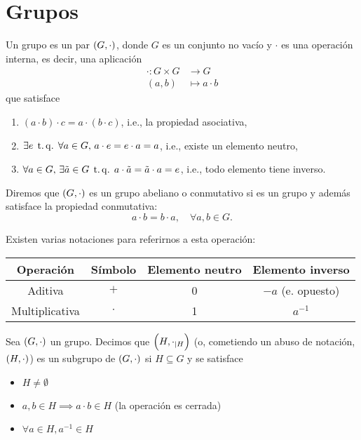 \chapter{Grupos}

\begin{defi}[grupo]
    Un grupo es un par $\left( G, \cdot \right)$, donde $G$ es un conjunto no vacío y $\cdot$ es una operación interna, es decir, una aplicación
    \[
        \begin{aligned}
            \cdot \colon G \times G &\to G \\
            (a, b) &\mapsto a \cdot b
        \end{aligned}
    \]
    que satisface
    \begin{enumerate}
        \item $(a\cdot b)\cdot c = a\cdot (b\cdot c)$, i.e., la propiedad asociativa,
        \item $\exists e \operatorname{\;t.q.\;} \forall a \in G, \, a\cdot e = e\cdot a = a$, i.e., existe un elemento neutro,
        \item $\forall a \in G, \, \exists \tilde{a} \in G \operatorname{\;t.q.\;} a \cdot \tilde{a} = \tilde{a}\cdot a = e$, i.e., todo elemento tiene inverso.
    \end{enumerate}
\end{defi}

\begin{defi}
    Diremos que $\left( G, \cdot \right)$ es un grupo abeliano o conmutativo si es un grupo y además satisface la propiedad conmutativa:
    \[
        a\cdot b = b\cdot a, \quad \forall a, b \in G.
    \]
\end{defi}

\begin{obs}
    Existen varias notaciones para referirnos a esta operación:
    \begin{center}
        \begin{tabular}{|c|c|c|c|} \hline
            Operación & S\'imbolo & Elemento neutro & Elemento inverso \\ \hline \hline
            Aditiva & $+$ & 0 & $-a$ (e. opuesto) \\ \hline
            Multiplicativa & $\cdot$ & 1 & $a^{-1}$ \\ \hline
        \end{tabular}
    \end{center}
\end{obs}

\begin{defi}[subgrupo]
    Sea $\left( G, \cdot \right)$ un grupo. Decimos que $\left( H, \cdot_{\mid H} \right)$ (o, cometiendo un abuso de notación, $\left( H, \cdot \right)$) es un subgrupo de $\left( G, \cdot \right)$ si $H \subseteq G$ y se satisface
    \begin{itemize}
        \item $H \neq \emptyset$
        \item $a, b \in H \implies a\cdot b \in H$ (la operación es cerrada)
        \item $\forall a \in H, a^{-1} \in H$
    \end{itemize}
\end{defi}

